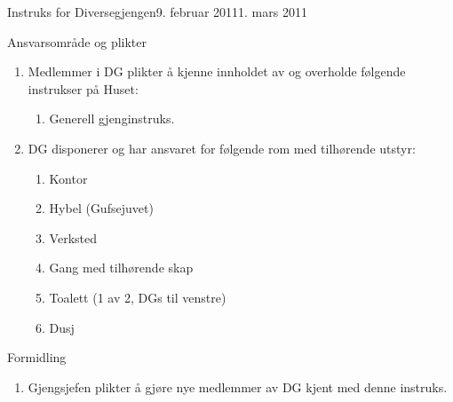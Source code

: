 \documentclass[../fsbok.tex]{subfiles}
\begin{document}
\begin{instruks}{Instruks for Diversegjengen}{9. februar 2011}{1. mars 2011}
    \begin{instruksledd}{Ansvarsområde og plikter}
        \begin{enumerate}   
            \item  Medlemmer i DG plikter å kjenne innholdet av og overholde følgende instrukser på Huset:
                \begin{enumerate}
                    \item Generell gjenginstruks.
                \end{enumerate}
            \item DG disponerer og har ansvaret for følgende rom med tilhørende utstyr:
                \begin{enumerate}
                    \item Kontor
                    \item Hybel (Gufsejuvet)
                    \item Verksted
                    \item Gang med tilhørende skap
                    \item Toalett (1 av 2, DGs til venstre)
                    \item  Dusj
                \end{enumerate}
        \end{enumerate}
    \end{instruksledd}

    \begin{instruksledd}{Formidling}
        \begin{enumerate}
            \item Gjengsjefen plikter å gjøre nye medlemmer av DG kjent med denne instruks.
        \end{enumerate}
    \end{instruksledd}


\end{instruks}
\end{document}
